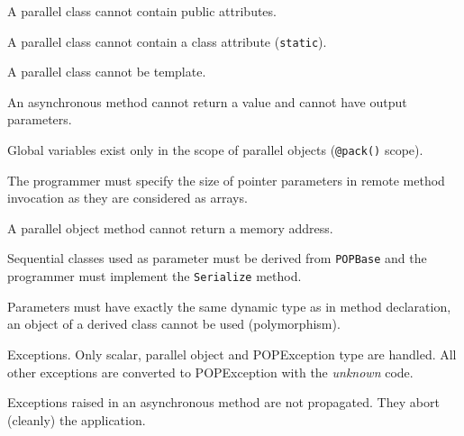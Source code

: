 \begin{petitem}

\item A parallel class cannot contain public attributes.

\item A parallel class cannot contain a class attribute (\texttt{static}).

\item A parallel class cannot be template.

\item An asynchronous method cannot return a value and cannot have
	output parameters.

\item Global variables exist only in the scope of parallel objects
	(\texttt{@pack()} scope).

\item The programmer must specify the size of pointer parameters in remote method invocation as they are considered as arrays.

\item A parallel object method cannot return a memory address.

\item Sequential classes used as parameter must be derived from
	\texttt{POPBase} and the programmer must implement the
	\texttt{Serialize} method.

\item Parameters must have exactly the same dynamic type as in method
	declaration, an object of a derived class cannot be used (polymorphism).

\item Exceptions. Only scalar, parallel object and POPException type are handled. All other exceptions are converted to POPException with the {\it unknown} code.

\item Exceptions raised in an asynchronous method are not propagated. They abort
(cleanly) the application.

\end{petitem}
